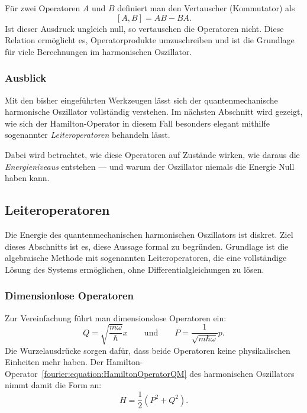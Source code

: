 		Für zwei Operatoren $A$ und $B$ definiert man den Vertauscher (Kommutator) als
		\begin{equation}\label{fourier:equation:Vertauschungsrelation}
			[A, B] = AB - BA.
		\end{equation}
		Ist dieser Ausdruck ungleich null, so vertauschen die Operatoren nicht.
		Diese Relation ermöglicht es, Operatorprodukte umzuschreiben und ist die Grundlage für viele Berechnungen im harmonischen Oszillator.

	\subsubsection{Ausblick\label{fourier:subsubsection:Ausblick}}
		Mit den bisher eingeführten Werkzeugen lässt sich der quantenmechanische harmonische Oszillator vollständig verstehen.
		Im nächsten Abschnitt wird gezeigt, wie sich der Hamilton-Operator in diesem Fall besonders elegant mithilfe sogenannter \emph{Leiteroperatoren} behandeln lässt.

		Dabei wird betrachtet, wie diese Operatoren auf Zustände wirken, wie daraus die \emph{Energieniveaus} entstehen ---
		und warum der Oszillator niemals die Energie Null haben kann.

	\subsection{Leiteroperatoren\label{fourier:subsection:Leiteroperatoren}}
		Die Energie des quantenmechanischen harmonischen Oszillators ist diskret.
		Ziel dieses Abschnitts ist es, diese Aussage formal zu begründen.
		Grundlage ist die algebraische Methode mit sogenannten Leiteroperatoren, die eine vollständige Lösung des Systems ermöglichen, ohne Differentialgleichungen zu lösen.	

		\subsubsection{Dimensionlose Operatoren\label{fourier:subsubsection:DimensionsloseOperatoren}}
			Zur Vereinfachung führt man dimensionslose Operatoren ein:
			\[
				Q = \sqrt{\frac{m\omega}{\hbar}}x
				\qquad\text{und}\qquad
				P = \frac{1}{\sqrt{m\hbar\omega}}p.
			\]
			Die Wurzelausdrücke sorgen dafür, dass beide Operatoren keine physikalischen Einheiten mehr haben.
			Der Hamilton-Operator~\ref{fourier:equation:HamiltonOperatorQM} des harmonischen Oszillators nimmt damit die Form an:
			\begin{equation}\label{fourier:equation:HamiltonOperatorDimLos}
				H = \frac{1}{2}(P^2 + Q^2).
			\end{equation}

